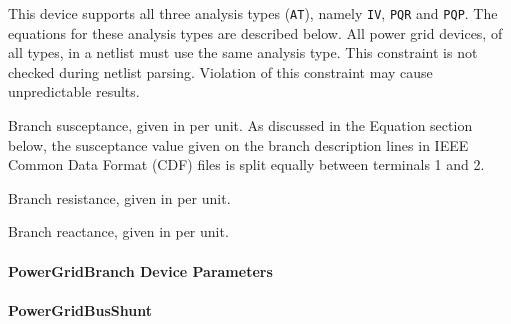 \begin{Device}
\begin{Parameters}
This device supports all three analysis types (\texttt{AT}), namely \texttt{IV}, 
\texttt{PQR} and \texttt{PQP}.  The equations for these analysis types are described 
below.  All power grid devices, of all types, in a \Xyce{} netlist must use the 
same analysis type.  This constraint is not checked during netlist parsing.  
Violation of this constraint may cause unpredictable results.

Branch susceptance, given in per unit.  As discussed in the Equation section below, 
the susceptance value given on the branch description lines in 
IEEE Common Data Format (CDF) files is split equally between terminals 1 and 2.

Branch resistance, given in per unit.

Branch reactance, given in per unit.

\end{Parameters}
\end{Device}

\paragraph{PowerGridBranch Device Parameters}




\paragraph{PowerGridBusShunt}

